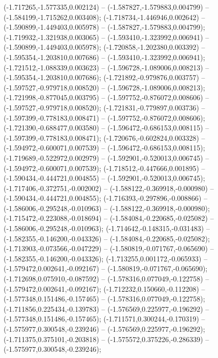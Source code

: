  (-1.717265,-1.577335,0.002124) -- (-1.587827,-1.579883,0.004799) -- (-1.584199,-1.715262,0.003408);
 (-1.718734,-1.446946,0.002642) -- (-1.590899,-1.449403,0.005978) -- (-1.587827,-1.579883,0.004799);
 (-1.719932,-1.321938,0.003065) -- (-1.593410,-1.323992,0.006941) -- (-1.590899,-1.449403,0.005978);
 (-1.720858,-1.202380,0.003392) -- (-1.595354,-1.203810,0.007686) -- (-1.593410,-1.323992,0.006941);
 (-1.721512,-1.088339,0.003623) -- (-1.596728,-1.089006,0.008213) -- (-1.595354,-1.203810,0.007686);
 (-1.721892,-0.979876,0.003757) -- (-1.597527,-0.979718,0.008520) -- (-1.596728,-1.089006,0.008213);
 (-1.721998,-0.877045,0.003795) -- (-1.597752,-0.876072,0.008606) -- (-1.597527,-0.979718,0.008520);
 (-1.721831,-0.779897,0.003736) -- (-1.597399,-0.778183,0.008471) -- (-1.597752,-0.876072,0.008606);
 (-1.721390,-0.688477,0.003580) -- (-1.596472,-0.686153,0.008115) -- (-1.597399,-0.778183,0.008471);
 (-1.720676,-0.602824,0.003328) -- (-1.594972,-0.600071,0.007539) -- (-1.596472,-0.686153,0.008115);
 (-1.719689,-0.522972,0.002979) -- (-1.592901,-0.520013,0.006745) -- (-1.594972,-0.600071,0.007539);
 (-1.718512,-0.447666,0.001895) -- (-1.590434,-0.444721,0.004855) -- (-1.592901,-0.520013,0.006745);
 (-1.717406,-0.372751,-0.002002) -- (-1.588122,-0.369918,-0.000980) -- (-1.590434,-0.444721,0.004855);
 (-1.716393,-0.297896,-0.008866) -- (-1.586006,-0.295248,-0.010963) -- (-1.588122,-0.369918,-0.000980);
 (-1.715472,-0.223088,-0.018694) -- (-1.584084,-0.220685,-0.025082) -- (-1.586006,-0.295248,-0.010963);
 (-1.714642,-0.148315,-0.031483) -- (-1.582355,-0.146200,-0.043326) -- (-1.584084,-0.220685,-0.025082);
 (-1.713903,-0.073566,-0.047229) -- (-1.580819,-0.071767,-0.065690) -- (-1.582355,-0.146200,-0.043326);
 (-1.713255,0.001172,-0.065933) -- (-1.579472,0.002641,-0.092167) -- (-1.580819,-0.071767,-0.065690);
 (-1.712698,0.075910,-0.087592) -- (-1.578316,0.077049,-0.122758) -- (-1.579472,0.002641,-0.092167);
 (-1.712232,0.150660,-0.112208) -- (-1.577348,0.151486,-0.157465) -- (-1.578316,0.077049,-0.122758);
 (-1.711856,0.225434,-0.139783) -- (-1.576569,0.225977,-0.196292) -- (-1.577348,0.151486,-0.157465);
 (-1.711571,0.300244,-0.170319) -- (-1.575977,0.300548,-0.239246) -- (-1.576569,0.225977,-0.196292);
 (-1.711375,0.375101,-0.203818) -- (-1.575572,0.375226,-0.286339) -- (-1.575977,0.300548,-0.239246);
